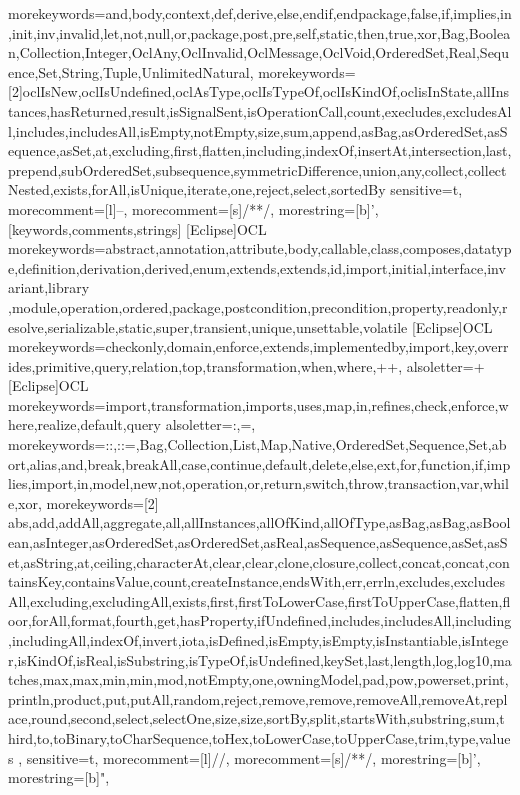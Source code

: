  {
    morekeywords={and,body,context,def,derive,else,endif,endpackage,false,if,implies,in,init,inv,invalid,let,not,null,or,package,post,pre,self,static,then,true,xor,Bag,Boolean,Collection,Integer,OclAny,OclInvalid,OclMessage,OclVoid,OrderedSet,Real,Sequence,Set,String,Tuple,UnlimitedNatural},%
    morekeywords=[2]{oclIsNew,oclIsUndefined,oclAsType,oclIsTypeOf,oclIsKindOf,oclisInState,allInstances,hasReturned,result,isSignalSent,isOperationCall,count,execludes,excludesAll,includes,includesAll,isEmpty,notEmpty,size,sum,append,asBag,asOrderedSet,asSequence,asSet,at,excluding,first,flatten,including,indexOf,insertAt,intersection,last,prepend,subOrderedSet,subsequence,symmetricDifference,union,any,collect,collectNested,exists,forAll,isUnique,iterate,one,reject,select,sortedBy}
    sensitive=t,%
    morecomment=[l]--,%
    morecomment=[s]{/*}{*/},%
    morestring=[b]',%
}[keywords,comments,strings]
[Eclipse]{OCL}{
    morekeywords={abstract,annotation,attribute,body,callable,class,composes,datatype,definition,derivation,derived,enum,extends,extends,id,import,initial,interface,invariant,library ,module,operation,ordered,package,postcondition,precondition,property,readonly,resolve,serializable,static,super,transient,unique,unsettable,volatile}
}
[Eclipse]{OCL}{
    morekeywords={checkonly,domain,enforce,extends,implementedby,import,key,overrides,primitive,query,relation,top,transformation,when,where,++},%
    alsoletter={+}
}
[Eclipse]{OCL}{
    morekeywords={import,transformation,imports,uses,map,in,refines,check,enforce,where,realize,default,query}
}
 {
    alsoletter={:,=},
    morekeywords={::,::=,Bag,Collection,List,Map,Native,OrderedSet,Sequence,Set,abort,alias,and,break,breakAll,case,continue,default,delete,else,ext,for,function,if,implies,import,in,model,new,not,operation,or,return,switch,throw,transaction,var,while,xor},%
    morekeywords=[2]{ abs,add,addAll,aggregate,all,allInstances,allOfKind,allOfType,asBag,asBag,asBoolean,asInteger,asOrderedSet,asOrderedSet,asReal,asSequence,asSequence,asSet,asSet,asString,at,ceiling,characterAt,clear,clear,clone,closure,collect,concat,concat,containsKey,containsValue,count,createInstance,endsWith,err,errln,excludes,excludesAll,excluding,excludingAll,exists,first,firstToLowerCase,firstToUpperCase,flatten,floor,forAll,format,fourth,get,hasProperty,ifUndefined,includes,includesAll,including,includingAll,indexOf,invert,iota,isDefined,isEmpty,isEmpty,isInstantiable,isInteger,isKindOf,isReal,isSubstring,isTypeOf,isUndefined,keySet,last,length,log,log10,matches,max,max,min,min,mod,notEmpty,one,owningModel,pad,pow,powerset,print,println,product,put,putAll,random,reject,remove,remove,removeAll,removeAt,replace,round,second,select,selectOne,size,size,sortBy,split,startsWith,substring,sum,third,to,toBinary,toCharSequence,toHex,toLowerCase,toUpperCase,trim,type,values
    },%
    sensitive=t,%
    morecomment=[l]//,%
    morecomment=[s]{/*}{*/},%
    morestring=[b]',%
    morestring=[b]",%
}
